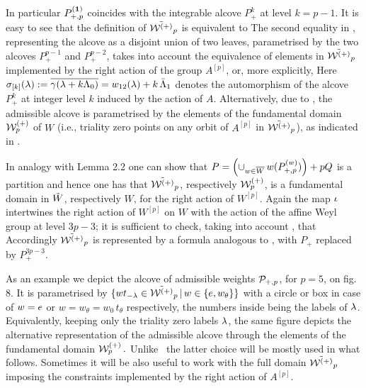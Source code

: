 \noindent
In particular $P_{+,p}^{({\bf 1})}$ coincides with the integrable
alcove $P_+^{k}$ at level $k=p-1$.  It is easy to see that the
definition of $\tilde{{\cal W}^{(+)}}_p$ is equivalent to
%
\eqn{}
%
%
\eqn{}
%
The second equality in \alcIIa, representing the alcove as a
disjoint union of two leaves, parametrised by the two alcoves
$P_+^{p-1}$ and $P_{+}^{p-2}$, takes into account the equivalence
of elements in $\tilde{{\cal W}^{(+)}}_p$ implemented by the right action of the
group  $A^{[p]}$, or, more explicitly,
%
\eqn{}
%
Here $\sigma_{[k]}(\lambda):=\overline{\gamma(\lambda+k\Lambda_0)}=
w_{12}(\lambda)+k\,\bar{\Lambda}_1$ denotes the automorphism of the alcove
$P_+^{k}$ at integer level $k$ induced by the action of $A$.
Alternatively,  due to \pa,  the admissible alcove is parametrised
 by the
elements of the fundamental domain ${\cal W}^{(+)}_p$ of $W$ (i.e., triality
zero points on any orbit of $A^{[p]}$ in $\tilde{{\cal W}^{(+)}}_p$), as indicated
in \alcII.

In analogy with  Lemma 2.2  one can show that $P=\left(
\cup_{w\in\overline W} \, w(P^{(w)}_{+,p}) \right) + pQ$
\quad is a partition and hence one has that  
$\tilde{{\cal W}^{(+)}}_p$, respectively ${\cal W}^{(+)}_p$, is a fundamental domain in $\tilde W$, 
respectively $W$, for the
right action of $W^{[p]}$. 
Again the
map $\iota$ intertwines the right action of $W^{[p]}$ on $W$ with
the action of the affine Weyl group at level $3p-3$; it is
sufficient to check, taking into account \Ic, that
%
\eqn{}
% 
Accordingly $\tilde{{\cal W}^{(+)}}_p$ is represented by a formula analogous to \If,
with $P_+$ replaced by  $P_+^{3p-3}$.


As an example we depict the alcove of admissible weights
${\cal P}_{+,p}$, for  $p=5$, on fig. 8.  It is parametrised by $\{
wt_{-\lambda}\in\tilde{{\cal W}^{(+)}}_p\,|\,w\in\{e,w_{\theta}\}\}$ with a circle
or box in case of $w=e$ or $w=w_\theta=w_0\, t_{\theta}$
respectively, the numbers inside being the labels of $\lambda$.
Equivalently, 
keeping only the triality zero labels $\lambda$, the same figure
depicts the alternative representation of the admissible alcove
through the elements of the fundamental domain ${\cal W}^{(+)}_p\,.$ Unlike
\FGP\ the latter choice will be mostly used in what follows.  
Sometimes it will be also useful to work 
with  the full domain $\tilde{{\cal W}^{(+)}}_p\,$  imposing the constraints
implemented by the right action of $A^{[p]}$.  

